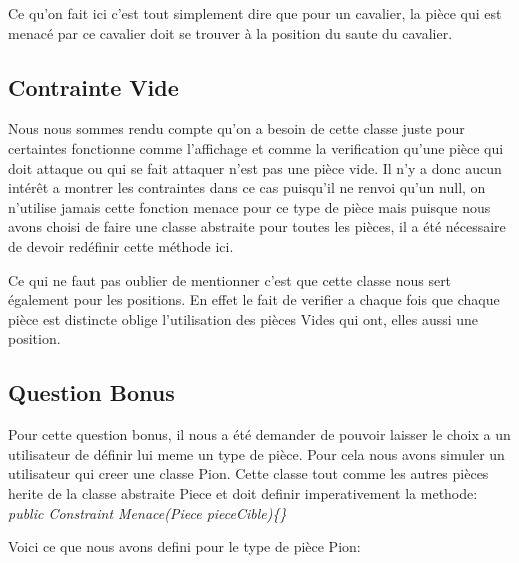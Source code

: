 \documentclass[a4paper,10pt]{article}
\begin{document}
Ce qu'on fait ici c'est tout simplement dire que pour un cavalier, la pièce qui est menacé par ce cavalier doit se trouver à la position du saute du cavalier.

\subsection{Contrainte Vide}
Nous nous sommes rendu compte qu'on a besoin de cette classe juste pour certaintes fonctionne comme l'affichage et comme la verification qu'une pièce qui doit attaque ou qui se fait attaquer n'est pas une pièce vide. Il n'y a donc aucun intérêt a montrer les contraintes dans ce cas puisqu'il ne renvoi qu'un null, on n'utilise jamais cette fonction menace pour ce type de pièce mais puisque nous avons choisi de faire une classe abstraite pour toutes les pièces, il a été nécessaire de devoir redéfinir cette méthode ici.

Ce qui ne faut pas oublier de mentionner c'est que cette classe nous sert également pour les positions. En effet le fait de verifier a chaque fois que chaque pièce est distincte oblige l'utilisation des pièces Vides qui ont, elles aussi une position.

\subsection{Question Bonus}
\par Pour cette question bonus, il nous a été demander de pouvoir laisser le choix a un utilisateur de définir lui meme un type de pièce. Pour cela nous avons simuler un utilisateur qui creer une classe Pion. Cette classe tout comme les autres pièces herite de la classe abstraite Piece et doit definir imperativement la methode: \textit{public Constraint Menace(Piece pieceCible)\{\}}

Voici ce que nous avons defini pour le type de pièce Pion:
\end{document}
